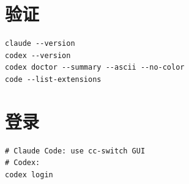 \documentclass[11pt,a4paper]{ctexbook}
\begin{document}
\section{验证}

\begin{lstlisting}[language={}]
claude --version
codex --version
codex doctor --summary --ascii --no-color
code --list-extensions
\end{lstlisting}

\section{登录}

\begin{lstlisting}[language={}]
# Claude Code: use cc-switch GUI
# Codex:
codex login
\end{lstlisting}

\backmatter
\printindex
\end{document}
